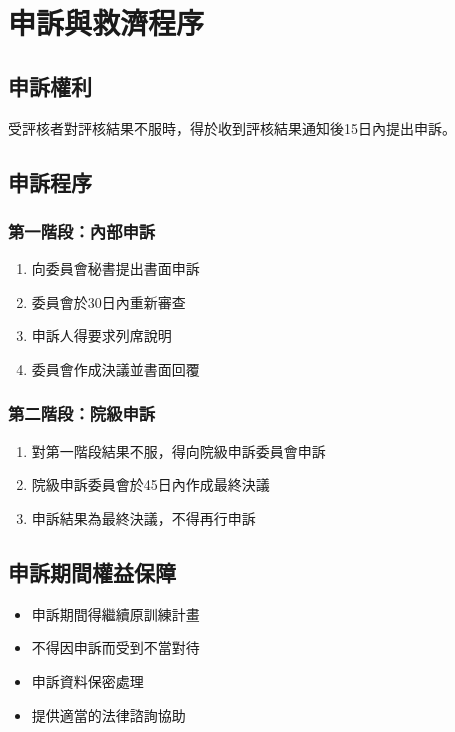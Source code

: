 \documentclass[12pt,a4paper]{article}
\begin{document}
\section{申訴與救濟程序}
\subsection{申訴權利}
受評核者對評核結果不服時，得於收到評核結果通知後15日內提出申訴。
\subsection{申訴程序}
\subsubsection{第一階段：內部申訴}
\begin{enumerate}
    \item 向委員會秘書提出書面申訴
    \item 委員會於30日內重新審查
    \item 申訴人得要求列席說明
    \item 委員會作成決議並書面回覆
\end{enumerate}
\subsubsection{第二階段：院級申訴}
\begin{enumerate}
    \item 對第一階段結果不服，得向院級申訴委員會申訴
    \item 院級申訴委員會於45日內作成最終決議
    \item 申訴結果為最終決議，不得再行申訴
\end{enumerate}
\subsection{申訴期間權益保障}
\begin{itemize}[nosep]
    \item 申訴期間得繼續原訓練計畫
    \item 不得因申訴而受到不當對待
    \item 申訴資料保密處理
    \item 提供適當的法律諮詢協助
\end{itemize}
\end{document}
